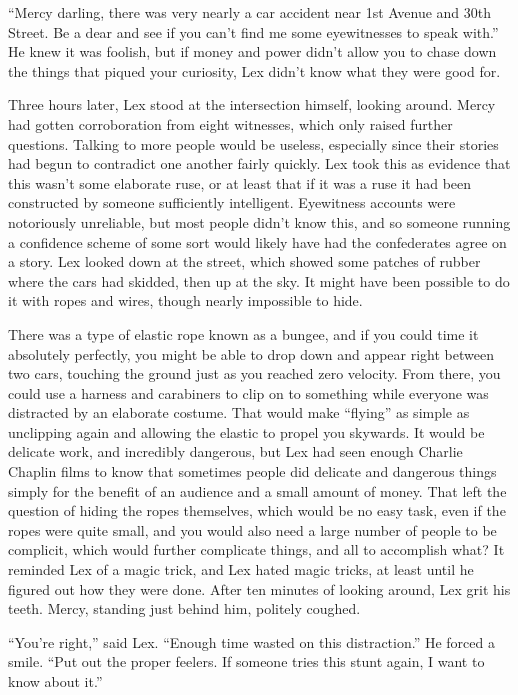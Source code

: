 ``Mercy darling, there was very nearly a car accident near 1st Avenue
and 30th Street. Be a dear and see if you can't find me some
eyewitnesses to speak with.'' He knew it was foolish, but if money and
power didn't allow you to chase down the things that piqued your
curiosity, Lex didn't know what they were good for.

Three hours later, Lex stood at the intersection himself, looking
around. Mercy had gotten corroboration from eight witnesses, which only
raised further questions. Talking to more people would be useless,
especially since their stories had begun to contradict one another
fairly quickly. Lex took this as evidence that this wasn't some
elaborate ruse, or at least that if it was a ruse it had been
constructed by someone sufficiently intelligent. Eyewitness accounts
were notoriously unreliable, but most people didn't know this, and so
someone running a confidence scheme of some sort would likely have had
the confederates agree on a story. Lex looked down at the street, which
showed some patches of rubber where the cars had skidded, then up at the
sky. It might have been possible to do it with ropes and wires, though
nearly impossible to hide.

There was a type of elastic rope known as a bungee, and if you could
time it absolutely perfectly, you might be able to drop down and appear
right between two cars, touching the ground just as you reached zero
velocity. From there, you could use a harness and carabiners to clip on
to something while everyone was distracted by an elaborate costume. That
would make ``flying'' as simple as unclipping again and allowing the
elastic to propel you skywards. It would be delicate work, and
incredibly dangerous, but Lex had seen enough Charlie Chaplin films to
know that sometimes people did delicate and dangerous things simply for
the benefit of an audience and a small amount of money. That left the
question of hiding the ropes themselves, which would be no easy task,
even if the ropes were quite small, and you would also need a large
number of people to be complicit, which would further complicate things,
and all to accomplish what? It reminded Lex of a magic trick, and Lex
hated magic tricks, at least until he figured out how they were done.
After ten minutes of looking around, Lex grit his teeth. Mercy, standing
just behind him, politely coughed.

``You're right,'' said Lex. ``Enough time wasted on this distraction.''
He forced a smile. ``Put out the proper feelers. If someone tries this
stunt again, I want to know about it.''

